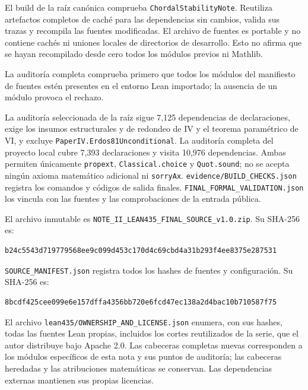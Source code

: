\documentclass[spanish,11pt,a4paper]{article}
\begin{document}
El build de la raíz canónica comprueba \nolinkurl{ChordalStabilityNote}.
Reutiliza artefactos completos de caché para las dependencias sin
cambios, valida sus trazas y recompila las fuentes modificadas. El
archivo de fuentes es portable y no contiene cachés ni uniones locales
de directorios de desarrollo. Esto no afirma que se hayan recompilado
desde cero todos los módulos previos ni Mathlib.

La auditoría completa comprueba primero que todos los módulos del
manifiesto de fuentes estén presentes en el entorno Lean importado; la
ausencia de un módulo provoca el rechazo.

La auditoría seleccionada de la raíz sigue 7,125 dependencias de
declaraciones, exige los insumos estructurales y de redondeo de IV y el
teorema paramétrico de VI, y excluye
\nolinkurl{PaperIV.Erdos81Unconditional}. La auditoría completa del
proyecto local cubre 7,393 declaraciones y visita 10,976 dependencias.
Ambas permiten únicamente \nolinkurl{propext}, \nolinkurl{Classical.choice} y
\nolinkurl{Quot.sound}; no se acepta ningún axioma matemático adicional ni
\nolinkurl{sorryAx}. \nolinkurl{evidence/BUILD_CHECKS.json} registra los
comandos y códigos de salida finales.
\nolinkurl{FINAL_FORMAL_VALIDATION.json} los vincula con las fuentes y
las comprobaciones de la entrada pública.

El archivo inmutable es
\nolinkurl{NOTE_II_LEAN435_FINAL_SOURCE_v1.0.zip}. Su SHA-256 es:

\begin{verbatim}
b24c5543d719779568ee9c099d453c170d4c69cbd4a31b293f4ee8375e287531
\end{verbatim}

\nolinkurl{SOURCE_MANIFEST.json} registra todos los hashes de fuentes y
configuración. Su SHA-256 es:

\begin{verbatim}
8bcdf425cee099e6e157dffa4356bb720e6fcd47ec138a2d4bac10b710587f75
\end{verbatim}

El archivo \nolinkurl{lean435/OWNERSHIP_AND_LICENSE.json} enumera, con
sus hashes, todas las fuentes Lean propias, incluidos los cortes
reutilizados de la serie, que el autor distribuye bajo Apache 2.0. Las
cabeceras completas nuevas corresponden a los módulos específicos de
esta nota y sus puntos de auditoría; las cabeceras heredadas y las
atribuciones matemáticas se conservan. Las dependencias externas
mantienen sus propias licencias.
\end{document}
